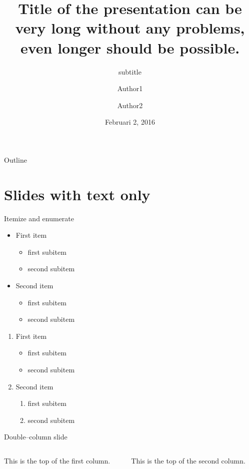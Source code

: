 \documentclass[11pt,t]{beamer}
\title{Title of the presentation can be very long without any problems, even longer should be possible.}
\subtitle{subtitle}
\author{Author1\inst{1} \and Author2\inst{2}}
\institute{
	\inst{1}Institute 1 \and
	\inst{2}Institute 2
}
\date{Februari 2, 2016}
\begin{document}
	{
	\begin{frame}
		\titlepage
	\end{frame}
	}
\begin{frame}{Outline}
	\vskip 5mm
	\hfill	{\large \parbox{.95\textwidth}{\tableofcontents[hideallsubsections]}}
\end{frame}

\section{Slides with text only}
\begin{frame}{Itemize and enumerate}
	\begin{itemize}
		\item First item
			\begin{itemize}
				\item first subitem
				\item second subitem
			\end{itemize}
		\item Second item
			\begin{itemize}
				\item first subitem
				\item second subitem
			\end{itemize}
	\end{itemize}
	
	\begin{enumerate}
		\item First item
			\begin{itemize}
				\item first subitem
				\item second subitem
			\end{itemize}
		\item Second item
			\begin{enumerate}
				\item first subitem
				\item second subitem
			\end{enumerate}
	\end{enumerate}
\end{frame}
\begin{frame}[t]{Double--column slide}
	\begin{columns}[t]
		\begin{column}{.5\textwidth}
			This is the top of the first column.	
		\end{column}
		\begin{column}{.5\textwidth}
			This is the top of the second column.
		\end{column}
	\end{columns}	
\end{frame}
\end{document}

